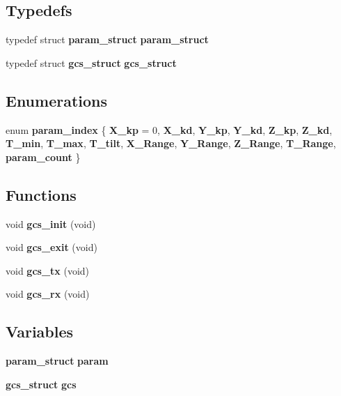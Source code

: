 \subsection*{Typedefs}
\begin{DoxyCompactItemize}
\item 
typedef struct \textbf{ param\+\_\+struct} \textbf{ param\+\_\+struct}
\item 
typedef struct \textbf{ gcs\+\_\+struct} \textbf{ gcs\+\_\+struct}
\end{DoxyCompactItemize}
\subsection*{Enumerations}
\begin{DoxyCompactItemize}
\item 
enum \textbf{ param\+\_\+index} \{ \newline
\textbf{ X\+\_\+kp} = 0, 
\textbf{ X\+\_\+kd}, 
\textbf{ Y\+\_\+kp}, 
\textbf{ Y\+\_\+kd}, 
\newline
\textbf{ Z\+\_\+kp}, 
\textbf{ Z\+\_\+kd}, 
\textbf{ T\+\_\+min}, 
\textbf{ T\+\_\+max}, 
\newline
\textbf{ T\+\_\+tilt}, 
\textbf{ X\+\_\+\+Range}, 
\textbf{ Y\+\_\+\+Range}, 
\textbf{ Z\+\_\+\+Range}, 
\newline
\textbf{ T\+\_\+\+Range}, 
\textbf{ param\+\_\+count}
 \}
\end{DoxyCompactItemize}
\subsection*{Functions}
\begin{DoxyCompactItemize}
\item 
void \textbf{ gcs\+\_\+init} (void)
\item 
void \textbf{ gcs\+\_\+exit} (void)
\item 
void \textbf{ gcs\+\_\+tx} (void)
\item 
void \textbf{ gcs\+\_\+rx} (void)
\end{DoxyCompactItemize}
\subsection*{Variables}
\begin{DoxyCompactItemize}
\item 
\textbf{ param\+\_\+struct} \textbf{ param}
\item 
\textbf{ gcs\+\_\+struct} \textbf{ gcs}
\end{DoxyCompactItemize}


